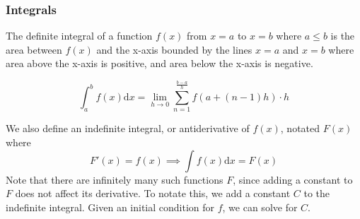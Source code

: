 \subsubsection{Integrals}
The definite integral of a function $f(x)$ from $x=a$ to $x=b$ where $a \leq b$ is the area between $f(x)$ and the x-axis bounded by the lines $x=a$ and $x=b$ where area above the x-axis is positive, and area below the x-axis is negative. 
\begin{definition}
	\begin{equation*}
		\int_{a}^{b}{f(x) \mathrm{d}x} = \lim\limits_{h \to 0}{\sum_{n=1}^{\frac{b-a}{h}}}{f(a + (n-1)h) \cdot h}
	\end{equation*}
\end{definition}

We also define an indefinite integral, or antiderivative of $f(x)$, notated $F(x)$ where
\begin{equation*}
F'(x) = f(x) \implies \int{f(x)\mathrm{d}x} = F(x)
\end{equation*}
Note that there are infinitely many such functions $F$, since adding a constant to $F$ does not affect its derivative. To notate this, we add a constant $C$ to the indefinite integral. Given an initial condition for $f$, we can solve for $C$.\\

